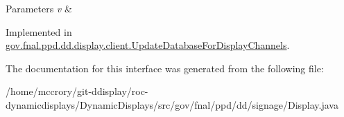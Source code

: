 \begin{DoxyParams}{Parameters}
{\em v} & \\
\hline
\end{DoxyParams}


Implemented in \hyperlink{classgov_1_1fnal_1_1ppd_1_1dd_1_1display_1_1client_1_1UpdateDatabaseForDisplayChannels_a20deb9f5431d716492d8af09ee38683d}{gov.\-fnal.\-ppd.\-dd.\-display.\-client.\-Update\-Database\-For\-Display\-Channels}.



The documentation for this interface was generated from the following file\-:\begin{DoxyCompactItemize}
\item 
/home/mccrory/git-\/ddisplay/roc-\/dynamicdisplays/\-Dynamic\-Displays/src/gov/fnal/ppd/dd/signage/Display.\-java\end{DoxyCompactItemize}

